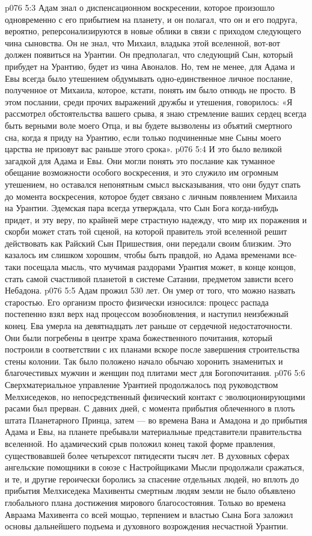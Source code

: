 \vs p076 5:3 \pc Адам знал о диспенсационном воскресении, которое произошло одновременно с его прибытием на планету, и он полагал, что он и его подруга, вероятно, реперсонализируются в новые облики в связи с приходом следующего чина сыновства. Он не знал, что Михаил, владыка этой вселенной, вот\hyp{}вот должен появиться на Урантии. Он предполагал, что следующий Сын, который прибудет на Урантию, будет из чина Авоналов. Но, тем не менее, для Адама и Евы всегда было утешением обдумывать одно\hyp{}единственное личное послание, полученное от Михаила, которое, кстати, понять им было отнюдь не просто. В этом послании, среди прочих выражений дружбы и утешения, говорилось: «Я рассмотрел обстоятельства вашего срыва, я знаю стремление ваших сердец всегда быть верными воле моего Отца, и вы будете вызволены из объятий смертного сна, когда я приду на Урантию, если только подчиненные мне Сыны моего царства не призовут вас раньше этого срока».
\vs p076 5:4 И это было великой загадкой для Адама и Евы. Они могли понять это послание как туманное обещание возможности особого воскресения, и это служило им огромным утешением, но оставался непонятным смысл высказывания, что они будут спать до момента воскресения, которое будет связано с личным появлением Михаила на Урантии. Эдемская пара всегда утверждала, что Сын Бога когда\hyp{}нибудь придет, и эту веру, по крайней мере страстную надежду, что мир их поражения и скорби может стать той сценой, на которой правитель этой вселенной решит действовать как Райский Сын Пришествия, они передали своим близким. Это казалось им слишком хорошим, чтобы быть правдой, но Адама временами все\hyp{}таки посещала мысль, что мучимая раздорами Урантия может, в конце концов, стать самой счастливой планетой в системе Сатании, предметом зависти всего Небадона.
\vs p076 5:5 \pc Адам прожил 530 лет. Он умер от того, что можно назвать старостью. Его организм просто физически износился: процесс распада постепенно взял верх над процессом возобновления, и наступил неизбежный конец. Ева умерла на девятнадцать лет раньше от сердечной недостаточности. Они были погребены в центре храма божественного почитания, который построили в соответствии с их планами вскоре после завершения строительства стены колонии. Так было положено начало обычаю хоронить знаменитых и благочестивых мужчин и женщин под плитами мест для Богопочитания.
\vs p076 5:6 \pc Сверхматериальное управление Урантией продолжалось под руководством Мелхиседеков, но непосредственный физический контакт с эволюционирующими расами был прерван. С давних дней, с момента прибытия облеченного в плоть штата Планетарного Принца, затем --- во времена Вана и Амадона и до прибытия Адама и Евы, на планете пребывали материальные представители правительства вселенной. Но адамический срыв положил конец такой форме правления, существовавшей более четырехсот пятидесяти тысяч лет. В духовных сферах ангельские помощники в союзе с Настройщиками Мысли продолжали сражаться, и те, и другие героически боролись за спасение отдельных людей, но вплоть до прибытия Мелхиседека Махивенты смертным людям земли не было объявлено глобального плана достижения мирового благосостояния. Только во времена Авраама Махивента со всей мощью, терпением и властью Сына Бога заложил основы дальнейшего подъема и духовного возрождения несчастной Урантии.
